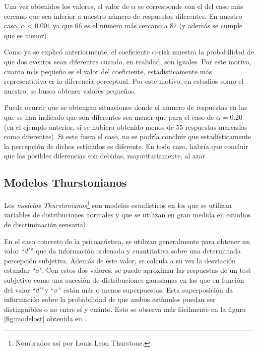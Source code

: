 \documentclass[11pt,a4paper]{book}
\begin{document}
            Una vez obtenidos los valores, el valor de $\alpha$ se corresponde con el del caso más cercano que sea inferior a nuestro número de respuestas diferentes. En nuestro caso, $\alpha<0.001$ ya que 66 es el número más cercano a 87 (y además se cumple que es menor).
            
            Como ya se explicó anteriormente, el coeficiente $\alpha$-risk muestra la probabilidad de que dos eventos sean diferentes cuando, en realidad, son iguales. Por este motivo, cuanto más pequeño es el valor del coeficiente, estadísticamente más representativa es la diferencia perceptual. Por este motivo, en estudios como el nuestro, se busca obtener valores pequeños.
            
            Puede ocurrir que se obtengan situaciones donde el número de respuestas en las que se han indicado que son diferentes sea menor que para el caso de $\alpha=0.20$ (en el ejemplo anterior, si se hubiera obtenido menos de 55 respuestas marcadas como diferentes). Si este fuera el caso, no se podría concluir que estadísticamente la percepción de dichos estímulos es diferente. En todo caso, habría que concluir que las posibles diferencias son debidas, mayoritariamente, al azar. 
            
        \subsection{Modelos Thurstonianos}
            Los \textit{modelos Thurstonianos}\footnote{Nombrados así por Louis Leon Thurstone.}\cite{PsychophysicsB, SignalB, delaPrida2019} son modelos estadísticos en los que se utilizan variables de distribuciones normales y que se utilizan en gran medida en estudios de discriminación sensorial. 
            
            En el caso concreto de la psicoacústica, se utilizan generalmente para obtener un valor ``$d'$'' que da información ordenada y cuantitativa sobre una determinada percepción subjetiva. Además de este valor, se calcula a su vez la desviación estandar ``$\sigma$''. Con estos dos valores, se puede aproximar las respuestas de un test subjetivo como una sucesión de distribuciones gaussianas en las que en función del valor ``$d'$''y ``$\sigma$'' están más o menos superpuestas. Esta superposición da información sobre la probabilidad de que ambos estímulos puedan ser distinguibles o no entre sí y cuánto. Esto se observa más fácilmente en la figura \ref{fig:modelost} obtenida en \cite{PsychophysicsB}.
            
\end{document}
